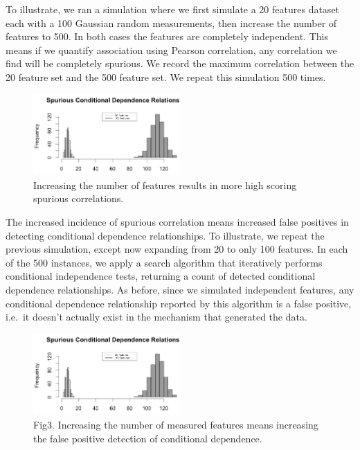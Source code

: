 \documentclass[journal=jacsat,manuscript=article]{achemso}
\begin{document}
To illustrate, we ran a simulation where we first simulate a 20 features
dataset each with a 100 Gaussian random measurements, then increase the
number of features to 500. In both cases the features are completely
independent. This means if we quantify association using Pearson
correlation, any correlation we find will be completely spurious. We
record the maximum correlation between the 20 feature set and the 500
feature set. We repeat this simulation 500 times.

\begin{figure}[!tpb]
\centerline{\includegraphics[width=0.5\textwidth]{figs/spurious_corr.png}}
\caption{Increasing the number of features results in more high scoring
spurious correlations.}
\label{spur_corr}
\end{figure}

The increased incidence of spurious correlation means increased false
positives in detecting conditional dependence relationships. To
illustrate, we repeat the previous simulation, except now expanding from
20 to only 100 features. In each of the 500 instances, we apply a search
algorithm that iteratively performs conditional independence tests,
returning a count of detected conditional dependence relationships. As
before, since we simulated independent features, any conditional
dependence relationship reported by this algorithm is a false positive,
i.e.~it doesn't actually exist in the mechanism that generated the data.

\begin{figure}[!tpb]
\centerline{\includegraphics[width=0.5\textwidth]{figs/spurious_dep.png}}
\caption{Fig3. Increasing the number of measured features means increasing the
false positive detection of conditional dependence.}
\label{spur_dep}
\end{figure}
\end{document}
